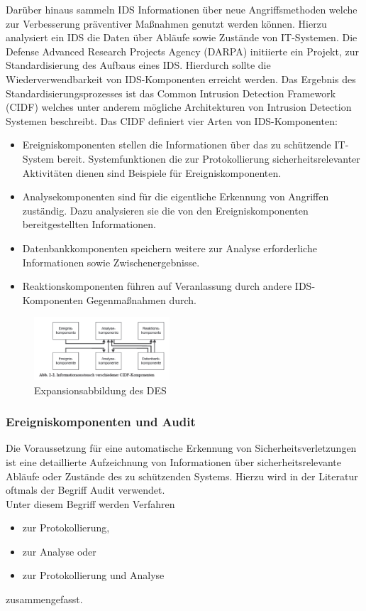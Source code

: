 \documentclass[11pt]{scrartcl}
\begin{document}
Darüber hinaus sammeln IDS Informationen über neue Angriffsmethoden welche zur Verbesserung präventiver Maßnahmen genutzt werden können. Hierzu analysiert ein IDS die Daten über Abläufe sowie Zustände von IT-Systemen. Die Defense Advanced Research Projects Agency (DARPA) initiierte ein Projekt, zur Standardisierung des Aufbaus eines IDS. Hierdurch sollte die Wiederverwendbarkeit von IDS-Komponenten erreicht werden. Das Ergebnis des Standardisierungsprozesses ist das Common Intrusion Detection Framework (CIDF) \cite{7} welches unter anderem mögliche Architekturen von Intrusion Detection Systemen beschreibt. 
Das CIDF definiert vier Arten von IDS-Komponenten:\\
\begin{itemize}
\item Ereigniskomponenten stellen die Informationen über das zu schützende IT-System
bereit. Systemfunktionen die zur Protokollierung sicherheitsrelevanter
Aktivitäten dienen sind Beispiele für Ereigniskomponenten.

\item Analysekomponenten sind für die eigentliche Erkennung von Angriffen zuständig.
Dazu analysieren sie die von den Ereigniskomponenten bereitgestellten
Informationen.

\item Datenbankkomponenten speichern weitere zur Analyse erforderliche Informationen
sowie Zwischenergebnisse.

\item Reaktionskomponenten führen auf Veranlassung durch andere IDS-Komponenten
Gegenmaßnahmen durch.
\end{itemize}

\begin{figure}
\includegraphics[width=0.45\textwidth]{aa3.png}
	\caption{Expansionsabbildung des DES \cite{5}}
	\label{fig2}
\end{figure} \noindent
\subsubsection{Ereigniskomponenten und Audit}
\label{sec:ereignis und audit}

Die Voraussetzung für eine automatische Erkennung von Sicherheitsverletzungen
ist eine detaillierte Aufzeichnung von Informationen über sicherheitsrelevante Abläufe
oder Zustände des zu schützenden Systems. Hierzu wird in der Literatur oftmals der Begriff Audit verwendet.\\
Unter diesem Begriff werden Verfahren
\begin{itemize}
\item zur Protokollierung,
\item zur Analyse oder
\item zur Protokollierung und Analyse
\end{itemize}
zusammengefasst.
\end{document}

